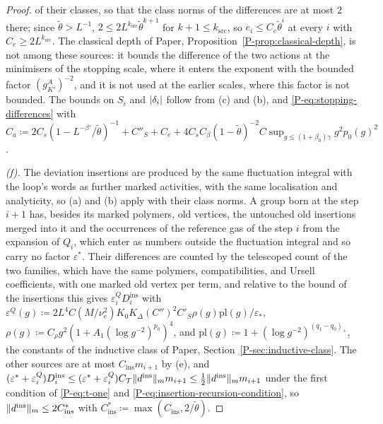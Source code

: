 \documentclass[11pt]{preprint}
\DeclarePairedDelimiter{\abs}{\lvert}{\rvert}
\DeclarePairedDelimiter{\norm}{\lVert}{\rVert}
\numberwithin{equation}{section}
\theoremstyle{definition}
\theoremstyle{remark}
\theoremstyle{plain}
\begin{document}
\begin{proof}
of their classes, so that the class norms of the differences are at most $2$ there; since $\tilde\theta > L^{-1}$, $2 \leq 2L^{k_{\mathrm{src}}}\tilde\theta^{k+1}$ for $k + 1 \leq k_{\mathrm{src}}$, so $e_i \leq C_e\tilde\theta^i$ at every $i$ with $C_e \geq 2L^{k_{\mathrm{src}}}$. The classical depth of Paper, Proposition~\ref{P-prop:classical-depth}, is not among these sources: it bounds the difference of the two actions at the minimisers of the stopping scale, where it enters the exponent with the bounded factor $(g^A_{K'})^{-2}$, and it is not used at the earlier scales, where this factor is not bounded. The bounds on $S_i$ and $\abs{\delta_i}$ follow from (c) and (b), and \eqref{P-eq:stopping-differences} with $C_a \coloneqq 2C_s(1 - L^{-\beta'}/\tilde\theta)^{-1} + C''_S + C_e + 4C_sC_\beta(1 - \tilde\theta)^{-2}C\sup_{g \leq (1+\beta_0)\gamma}g^2p_0(g)^2$.

\emph{(f).} The deviation insertions are produced by the same fluctuation integral with the loop's words as further marked activities, with the same localisation and analyticity, so (a) and (b) apply with their class norms. A group born at the step $i + 1$ has, besides its marked polymers, old vertices, the untouched old insertions merged into it and the occurrences of the reference gas of the step $i$ from the expansion of $Q_i$, which enter as numbers outside the fluctuation integral and so carry no factor $\varepsilon^*$. Their differences are counted by the telescoped count of the two families, which have the same polymers, compatibilities, and Ursell coefficients, with one marked old vertex per term, and relative to the bound of the insertions this gives $\varepsilon^Q_iD^{\mathrm{ins}}_i$ with $\varepsilon^Q(g) \coloneqq 2L^4C(M/\nu_e^2)K_0K_\Delta(C'')^2C'_S\rho(g)\mathrm{pl}(g)/\varepsilon_*$, $\rho(g) \coloneqq C_\rho g^2(1 + A_1(\log g^{-2})^{p_0})^4$, and $\mathrm{pl}(g) \coloneqq 1 + (\log g^{-2})^{(q_1-q_0)_+}$, the constants of the inductive class of Paper, Section~\ref{P-sec:inductive-class}. The other sources are at most $C_{\mathrm{ins}}m_{i+1}$ by (e), and $(\varepsilon^* + \varepsilon^Q_i)D^{\mathrm{ins}}_i \leq (\varepsilon^* + \varepsilon^Q_i)C_{\mathcal T}\norm{d^{\mathrm{ins}}}_mm_{i+1} \leq \frac12\norm{d^{\mathrm{ins}}}_mm_{i+1}$ under the first condition of \eqref{P-eq:t-one} and \eqref{P-eq:insertion-recursion-condition}, so $\norm{d^{\mathrm{ins}}}_m \leq 2C^*_{\mathrm{ins}}$ with $C^*_{\mathrm{ins}} \coloneqq \max(C_{\mathrm{ins}}, 2/\tilde\theta)$.


\end{proof}
\end{document}
